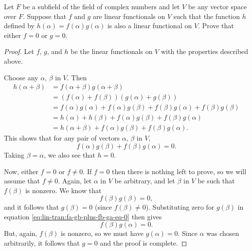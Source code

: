  Let $F$ be a subfield of the field of complex numbers
and let $V$ be any vector space over $F$. Suppose that $f$ and $g$ are
linear functionals on $V$ such that the function $h$ defined by
$h(\alpha) = f(\alpha)g(\alpha)$ is also a linear functional on
$V$. Prove that either $f = 0$ or $g = 0$.
\begin{proof}
  Let $f$, $g$, and $h$ be the linear functionals on $V$ with the
  properties described above.

  Choose any $\alpha$, $\beta$ in $V$. Then
  \begin{align*}
    h(\alpha + \beta)
    &= f(\alpha + \beta)g(\alpha + \beta) \\
    &= (f(\alpha) + f(\beta))(g(\alpha) + g(\beta)) \\
    &= f(\alpha)g(\alpha) + f(\alpha)g(\beta) + f(\beta)g(\alpha)
      + f(\beta)g(\beta) \\
    &= h(\alpha) + h(\beta) + f(\alpha)g(\beta) + f(\beta)g(\alpha) \\
    &= h(\alpha + \beta) + f(\alpha)g(\beta) + f(\beta)g(\alpha).
  \end{align*}
  This shows that for any pair of vectors $\alpha$, $\beta$ in $V$,
  \begin{equation}
    \label{eq:lin-tran:fa-gb-plus-fb-ga-eq-0}
    f(\alpha)g(\beta) + f(\beta)g(\alpha) = 0.
  \end{equation}
  Taking $\beta = \alpha$, we also see that $h = 0$.

  Now, either $f = 0$ or $f\neq0$. If $f = 0$ then there is nothing
  left to prove, so we will assume that $f\neq0$. Again, let $\alpha$
  in $V$ be arbitrary, and let $\beta$ in $V$ be such that $f(\beta)$
  is nonzero. We know that
  \begin{equation*}
    f(\beta)g(\beta) = 0,
  \end{equation*}
  and it follows that $g(\beta) = 0$ (since
  $f(\beta)\neq0$). Substituting zero for $g(\beta)$ in equation
  \eqref{eq:lin-tran:fa-gb-plus-fb-ga-eq-0} then gives
  \begin{equation*}
    f(\beta)g(\alpha) = 0.
  \end{equation*}
  But, again, $f(\beta)$ is nonzero, so we must have $g(\alpha) =
  0$. Since $\alpha$ was chosen arbitrarily, it follows that $g = 0$
  and the proof is complete.
\end{proof}

